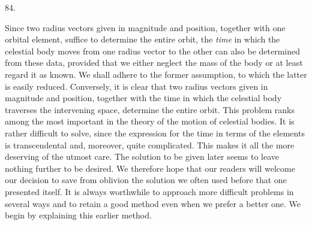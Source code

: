 \par{}\medskip
\hypertarget{native-113-article084}{}
\begin{center}84.\end{center}
Since two radius vectors given in magnitude and position, together with one orbital element, suffice to determine the entire orbit, the \emph{time} in which the celestial body moves from one radius vector to the other can also be determined from these data, provided that we either neglect the mass of the body or at least regard it as known. We shall adhere to the former assumption, to which the latter is easily reduced. Conversely, it is clear that two radius vectors given in magnitude and position, together with the time in which the celestial body traverses the intervening space, determine the entire orbit. This problem ranks among the most important in the theory of the motion of celestial bodies. It is rather difficult to solve, since the expression for the time in terms of the elements is transcendental and, moreover, quite complicated. This makes it all the more deserving of the utmost care. The solution to be given later seems to leave nothing further to be desired. We therefore hope that our readers will welcome our decision to save from oblivion the solution we often used before that one presented itself. It is always worthwhile to approach more difficult problems in several ways and to retain a good method even when we prefer a better one. We begin by explaining this earlier method.
